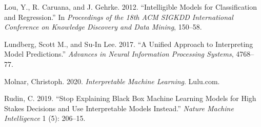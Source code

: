 \documentclass[
  letterpaper,
  DIV=11,
  numbers=noendperiod]{scrartcl}
\newlength{\cslhangindent}
\newlength{\cslentryspacingunit} %
\newenvironment{CSLReferences}[2] %
 {%
  \setlength{\parindent}{0pt}
  \ifodd #1
  \let\oldpar\par
  \def\par{\hangindent=\cslhangindent\oldpar}
  \fi
  \setlength{\parskip}{#2\cslentryspacingunit}
 }%
 {}
\begin{document}
\begin{CSLReferences}{1}{0}
\leavevmode{}%
Lou, Y., R. Caruana, and J. Gehrke. 2012. {``Intelligible Models for
Classification and Regression.''} In \emph{Proceedings of the 18th ACM
SIGKDD International Conference on Knowledge Discovery and Data Mining},
150--58.

\leavevmode{}%
Lundberg, Scott M., and Su-In Lee. 2017. {``A Unified Approach to
Interpreting Model Predictions.''} \emph{Advances in Neural Information
Processing Systems}, 4768--77.

\leavevmode{}%
Molnar, Christoph. 2020. \emph{Interpretable Machine Learning}.
Lulu.com.

\leavevmode{}%
Rudin, C. 2019. {``Stop Explaining Black Box Machine Learning Models for
High Stakes Decisions and Use Interpretable Models Instead.''}
\emph{Nature Machine Intelligence} 1 (5): 206--15.

\end{CSLReferences}
\end{document}
